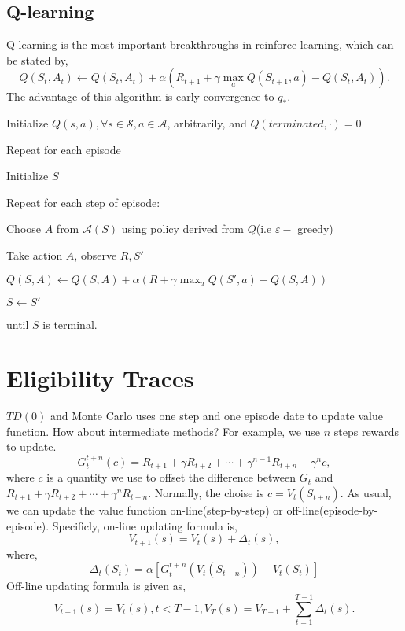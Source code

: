 \documentclass[11pt,a4paper]{article}
\def\S{{\mathcal S}}
\def\A{{\mathcal A}}
\begin{document}
\subsection{Q-learning}
Q-learning is the most important breakthroughs in reinforce learning, which can be stated by,
\begin{equation}
Q(S_t,A_t) \leftarrow Q(S_t,A_t) + \alpha(R_{t+1} + \gamma\max_a Q(S_{t+1},a) - Q(S_t,A_t)).
\end{equation}
The advantage of this algorithm is early convergence to $q_{*}$.
\begin{tcolorbox}
Initialize $Q(s,a), \forall s\in \S, a\in \A$, arbitrarily, and $Q(terminated,\cdot) = 0$ \par 
Repeat for each episode \par 
\hspace{1cm} Initialize $S$ \par 
\hspace{1cm} Repeat for each step of episode: \par 
\hspace{2cm} Choose $A$ from $\A(S)$ using policy derived from $Q$(i.e $\varepsilon-$ greedy) \par 
\hspace{2cm} Take action $A$, observe $R, S'$\par 
\hspace{2cm} $Q(S,A) \leftarrow Q(S,A) + \alpha(R + \gamma \max_a Q(S',a) - Q(S,A))$ \par 
\hspace{2cm} $S \leftarrow S'$ \par 
\hspace{1cm} until $S$ is terminal.
\end{tcolorbox}

\section{Eligibility Traces}
$TD(0)$ and Monte Carlo uses one step and one episode date to update value function. How about intermediate methods? For example, we use $n$ steps rewards to update.
\begin{equation}
G_{t}^{t+n}(c) = R_{t+1} + \gamma R_{t+2} + \cdots + \gamma^{n-1} R_{t+n} + \gamma^n c,
\end{equation}
where $c$ is a quantity we use to offset the difference between $G_t$ and $R_{t+1} + \gamma R_{t+2} + \cdots + \gamma^n R_{t+n}$. Normally, the choise is $c=V_t(S_{t+n})$. As usual, we can update the value function on-line(step-by-step) or off-line(episode-by-episode). Specificly, on-line updating formula is,
\begin{equation}
V_{t+1}(s) = V_t(s) + \Delta_t(s),
\end{equation}
where,
\begin{equation}
\Delta_t(S_t) = \alpha[G_{t}^{t+n}(V_t(S_{t+n}))-V_t(S_t)]
\end{equation}
Off-line updating formula is given as,
\begin{equation}
V_{t+1}(s) = V_t(s), t< T-1, V_{T}(s) = V_{T-1} + \sum_{t=1}^{T-1}\Delta_t(s).
\end{equation}
\end{document}
